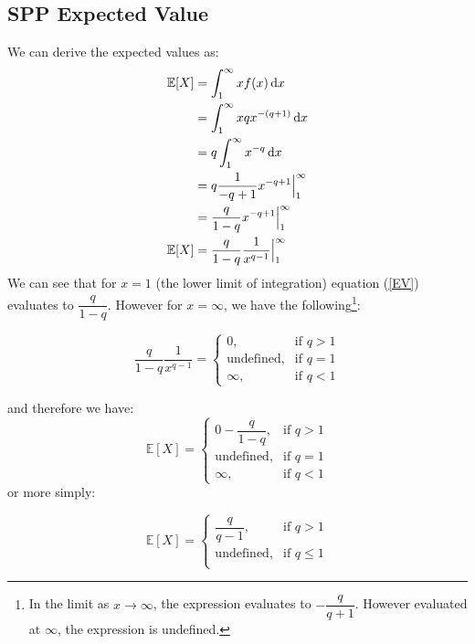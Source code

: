 \documentclass[]{article} %
\begin{document}
\subsection{SPP Expected Value}\label{derive:ParetoEV}
We can derive the expected values as:
\begin{align}
\mathbb{E}[X] & = \int_{1}^{\infty}x f(x) \operatorname{d \!} x \nonumber\\
& = \int_{1}^{\infty}xqx^{-(q+1)} \operatorname{d \!} x\nonumber\\
& = q \int_{1}^{\infty}x^{-q} \operatorname{d \!} x\nonumber\\
& = q \frac{1}{-q+1} x^{-q+1} \Big|_{1}^{\infty}\nonumber\\
& = \frac{q}{1-q} x^{-q+1} \Big|_{1}^{\infty}\nonumber\\
\mathbb{E}[X] 	& = \frac{q}{1-q} \dfrac{1}{x^{q-1}} \Big|_{1}^{\infty}\label{EV}
\end{align}
We can see that for $x = 1$ (the lower limit of integration) equation (\ref{EV}) evaluates to $\dfrac{q}{1-q}$. However for $x = \infty$, we have the following\footnote{In the limit as $x\to\infty$, the expression evaluates to  $-\dfrac{q}{q+1}$. However evaluated at $\infty$, the expression is undefined.}:

\[
\frac{q}{1-q} \dfrac{1}{x^{q-1}} = 
\begin{cases}
0,& \text{if } q > 1\\
\text{undefined},& \text{if } q = 1\\         
\infty, & \text{if }q < 1
\end{cases}
\]

and therefore we have: 
\[
\mathbb{E}[X]  = 
\begin{cases}
0 - \dfrac{q}{1-q},& \text{if } q > 1\\
\text{undefined},& \text{if } q = 1\\         
\infty, & \text{if }q < 1
\end{cases}
\]
or more simply:

\begin{equation}
\mathbb{E}[X]  = 
\begin{cases}
\dfrac{q}{q-1},& \text{if } q > 1\\
\text{undefined},& \text{if } q \leq 1\\         
\end{cases}
\end{equation}
\end{document}

